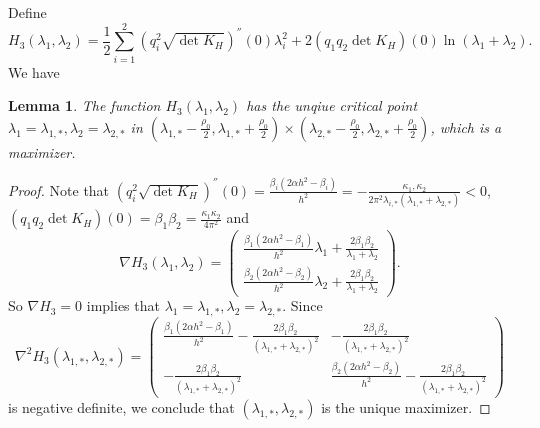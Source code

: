 \documentclass[12pt,reqno]{amsart}
\numberwithin{equation}{section}
\newtheorem{lemma}[theorem]{Lemma}
\theoremstyle{definition}
\theoremstyle{remark}
\begin{document}
Define 
$$H_3(\lambda_1,\lambda_2)=\frac{1}{2}\sum_{i=1}^2 \left(q_i^2\sqrt{\det K_H} \right)^{''}(0 )\lambda_i^2+2\left( q_1q_2 \det K_H\right)(0)\ln (\lambda_1+\lambda_2).$$
We have
\begin{lemma}\label{lm703}
	The function 
	$ H_3(\lambda_1,\lambda_2) $
	has the unqiue critical point $ \lambda_1=\lambda_{1,*}, \lambda_2=\lambda_{2,*} $ in $  \left( \lambda_{1,*}-\frac{\rho_0}{2}, \lambda_{1,*}+\frac{\rho_0}{2}\right)\times \left( \lambda_{2,*}-\frac{\rho_0}{2}, \lambda_{2,*}+\frac{\rho_0}{2}\right) $, which is a maximizer.
\end{lemma}  
\begin{proof}
	Note that $  \left(q_i^2\sqrt{\det K_H} \right)^{''}(0 )=\frac{\beta_i(2\alpha h^2-\beta_i)}{h^2}=-\frac{\kappa_1,\kappa_2}{2\pi^2\lambda_{i,*}(\lambda_{1,*}+\lambda_{2,*})}<0 $, $ \left( q_1q_2 \det K_H\right)(0)=\beta_1\beta_2=\frac{\kappa_1\kappa_2}{4\pi^2} $ and $$ \nabla H_3(\lambda_1,\lambda_2)=\begin{pmatrix}
   \frac{\beta_1(2\alpha h^2-\beta_1)}{h^2} \lambda_1+\frac{2\beta_1\beta_2}{\lambda_1+\lambda_2}    \\
 \frac{\beta_2(2\alpha h^2-\beta_2)}{h^2} \lambda_2+\frac{2\beta_1\beta_2}{\lambda_1+\lambda_2} 
	\end{pmatrix}.  $$ 
So $ \nabla H_3=0 $ implies that $ \lambda_1=\lambda_{1,*}, \lambda_2=\lambda_{2,*} $. Since
$$\nabla^2 H_3(\lambda_{1,*},\lambda_{2,*})=\begin{pmatrix}
\frac{\beta_1(2\alpha h^2-\beta_1)}{h^2}  -\frac{2\beta_1\beta_2}{(\lambda_{1,*}+\lambda_{2,*})^2} &  -\frac{2\beta_1\beta_2}{(\lambda_{1,*}+\lambda_{2,*})^2}   \\
-\frac{2\beta_1\beta_2}{(\lambda_{1,*}+\lambda_{2,*})^2} & \frac{\beta_2(2\alpha h^2-\beta_2)}{h^2}  -\frac{2\beta_1\beta_2}{(\lambda_{1,*}+\lambda_{2,*})^2}
\end{pmatrix}$$
is negative definite, we conclude that $  (\lambda_{1,*},\lambda_{2,*}) $ is the unique maximizer.
\end{proof}
%
\end{document}
